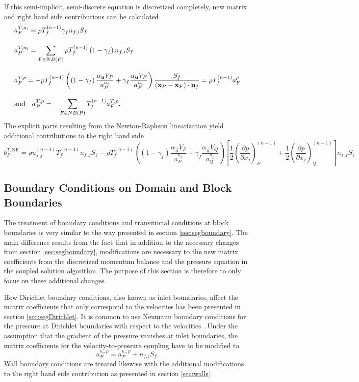 If this semi-implicit, semi-discrete equation is discretized completely, new matrix and right hand side contributions can be calculated
\begin{align*}
  \allowdisplaybreaks
  &a_F^{T,u_i} = \rho T_f^{(n-1)} \gamma_f n_{f,i} S_f \\[1.0em] 
  &a_P^{T,u_i} = \sum_{F \in NB(P)} \rho T_f^{(n-1)} \left(1-\gamma_f\right) n_{f,i} S_f \\[1.0em]
  &a_F^{T,p} = -\rho T_f^{(n-1)} \left(\left(1 - \gamma_f\right) \frac{\alpha_\vec{u} V_P}{a_P^{u_i}} + \gamma_f \frac{\alpha_\vec{u} V_F}{a_F^{u_i}}\right) \frac{S_f}{\left(\vec{x}_P - \vec{x}_F\right) \cdot \vec{n}_f} = \rho T_f^{(n-1)} a_F^{p} \\[1.0em] 
  &\text{and} \quad
  a_P^{T,p} = - \sum_{F \in NB(P)} T_f^{(n-1)} a_F^{T,p}.
\end{align*}
The explicit parts resulting from the Newton-Raphson linearization yield additional contributions to the right hand side
\begin{displaymath}
  b_P^{T,\text{NR}} 
  = 
  \rho u_{j,f}^{(n-1)} T_f^{(n-1)} n_{f,j} S_f 
  - \rho T_f^{(n-1)} \left(\left(1 - \gamma_f\right) \frac{\alpha_\vec{u} V_P}{a_P^{u_j}} + \gamma_f \frac{\alpha_\vec{u} V_Q}{a_Q^{u_j}}\right)
    \left[ 
    \frac{1}{2} \left( \frac{\partial p}{\partial x_j} \right)_P^{(n-1)} 
    + \frac{1}{2} \left(\frac{\partial p}{\partial x_j}\right)_Q^{(n-1)} 
    \right] n_{j,f} S_f
\end{displaymath}

\subsection{Boundary Conditions on Domain and Block Boundaries}

The treatment of boundary conditions and transitional conditions at block boundaries is very similar to the way presented in section \ref{sec:segboundary}. The main difference results from the fact that in addition to the necessary changes from section \ref{sec:segboundary}, modifications are necessary to the new matrix coefficients from the discretized momentum balance and the pressure equation in the coupled solution algorithm. The purpose of this section is therefore to only focus on these additional changes.

How Dirichlet boundary conditions, also known as inlet boundaries, affect the matrix coefficients that only correspond to the velocities has been presented in section \ref{sec:segDirichlet}. It is common to use Neumann boundary conditions for the pressure at Dirichlet boundaries with respect to the velocities \cite{darwish09}. Under the assumption that the gradient of the pressure vanishes at inlet boundaries, the matrix coefficients for the velocity-to-pressure coupling have to be modified to 
\begin{displaymath}
  a_P^{u_i,p} = a_P^{u_i,p} + n_{f,i} S_f.
\end{displaymath}
Wall boundary conditions are treated likewise with the additional modifications to the right hand side contribution as presented in section \ref{sec:walls}.

